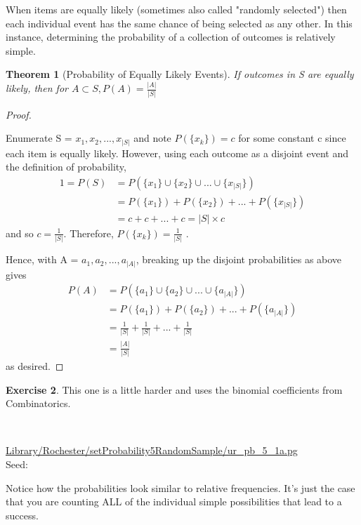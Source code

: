 \documentclass[10pt,]{book}
\theoremstyle{plain}
\newtheorem{theorem}{Theorem}[section]
\theoremstyle{definition}
\theoremstyle{definition}
\theoremstyle{definition}
\newtheorem{exercise}[theorem]{Exercise}
\numberwithin{equation}{section}
\begin{document}
	When items are equally likely (sometimes also called "randomly selected") then each individual event has the same chance of being selected as any other. In this instance, determining the probability of a collection of outcomes is relatively simple.
\begin{theorem}[{Probability of Equally Likely Events}]\label{theorem-16}
If outcomes in S are equally likely, then for \(A \subset S, P(A) = \frac{|A|}{|S|}\)\end{theorem}
\begin{proof}\hypertarget{proof-15}{}

	Enumerate S = {\(x_1, x_2, ..., x_{|S|}\)} and note \(P( \{ x_k \} ) = c\) for some constant c since each item is equally likely. However, using each outcome as a disjoint event and the definition of probability, 
	\begin{align*}
1 = P(S) & = P( \{ x_1 \} \cup \{x_2 \} \cup ... \cup \{x_{|S|} \} )\\
 & = P(\{ x_1 \}) + P(\{ x_2 \} ) + ... + P(\{ x_{|S|} \} )\\
 & = c + c + ... + c = {|S|} \times c
\end{align*}
	and so \(c = \frac{1}{{|S|}}\). Therefore, \(P( \{ x_k \} ) = \frac{1}{|S|}\) .
\par

	Hence, with A = {\(a_1, a_2, ..., a_{|A|}\)}, breaking up the disjoint probabilities as above gives
	\begin{align*}
P(A) & = P( \{ a_1 \} \cup \{ a_2 \} \cup ... \cup \{ a_{|A|} \} )\\
 & = P(\{ a_1 \}) + P(\{ a_2 \} ) + ... + P(\{ a_{|A|} \} )\\
 & = \frac{1}{{|S|}} + \frac{1}{{|S|}} + ... + \frac{1}{{|S|}}\\
 & = \frac{|A|}{{|S|}}
\end{align*}
	as desired.
\end{proof}
\begin{exercise}\label{exercise-7}
This one is a little harder and uses the binomial coefficients from Combinatorics.
\par\medskip
\mbox{}\\ %
\begin{mdframed}
{}\par\vspace*{2ex}%
{\tiny\ttfamily\noindent\url{Library/Rochester/setProbability5RandomSample/ur_pb_5_1a.pg}\\Seed: \hfill}\end{mdframed}
\medskip\noindent 
		Notice how the probabilities look similar to relative frequencies. It's just the case 
		that you are counting ALL of the individual simple possibilities that lead to a success.
\par
\end{exercise}
\typeout{************************************************}
\typeout{************************************************}
\end{document}
